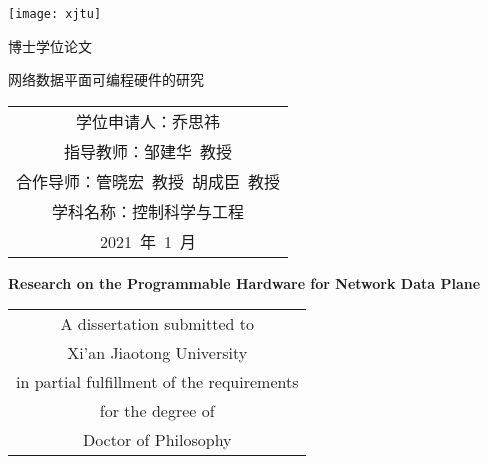 
\begin{titlepage}
	\begin{center}
		\begin{figure*}[!ht]\vspace{5em}
			\centering
			\texttt{[image: xjtu]}
		\end{figure*}
		
		\vspace{1.5em}
		\begin{center} { 博士学位论文} \end{center}
		
		\vspace{8.5em}
		\begin{center} {\sanhao\boldsong 网络数据平面可编程硬件的研究}\end{center}
		
		\vspace{15em}
		{\sanhao
			\begin{center} \renewcommand{\arraystretch}{1.5}
				\begin{tabular}{c}
					学位申请人：乔思祎 \\
					指导教师：邹建华~教授 \\
					合作导师：管晓宏~教授~胡成臣~教授\\
					学科名称：控制科学与工程 \\
					2021~年~1~月 \\
				\end{tabular} \renewcommand{\arraystretch}{1}
			\end{center} 
		}
	\end{center}
	\clearpage{\pagestyle{empty}\cleardoublepage}
	
	\newpage\thispagestyle{empty}
	\begin{center}
		\parbox[t][0.7cm][t]{\textwidth}{}
		
		\begin{center}{\sanhao\bfseries Research on the Programmable Hardware for Network Data Plane}\end{center}
		
		\vspace{4.7cm}
		{\sanhao
			\begin{center} \renewcommand{\arraystretch}{1.4}
				\begin{tabular}{c}
					A dissertation submitted to  \\
					Xi'an Jiaotong University \\
					in partial fulfillment of the requirements \\
					for the degree of \\
					Doctor of Philosophy \\
				\end{tabular} \renewcommand{\arraystretch}{1}
			\end{center} 
		}
		

\end{center}
\end{titlepage}
